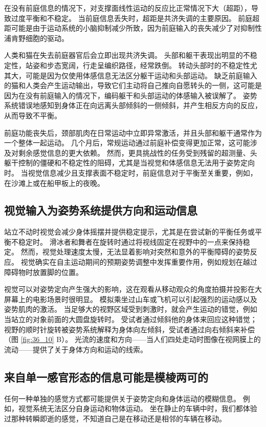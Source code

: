 在没有前庭信息的情况下，对支撑面线性运动的反应比正常情况下大（超距），导致过度平衡和不稳定。 当前庭信息丢失时，超距是共济失调的主要原因。 前庭超距可能是由于运动系统的小脑抑制减少所致，因为前庭输入的丧失减少了对抑制性浦肯野细胞的驱动。

人类和猫在失去前庭器官后会立即出现共济失调。 头部和躯干表现出明显的不稳定性，站姿和步态宽阔，行走呈编织路径，经常跌倒。 转动头部时的不稳定性尤其大，可能是因为仅使用体感信息无法区分躯干运动和头部运动。 缺乏前庭输入的猫和人类会产生运动输出，导致它们主动将自己推向自愿转头的一侧，这可能是因为在没有前庭输入的情况下，编码躯干和头部运动的体感输入被误解了。 姿势系统错误地感知到身体正在向远离头部倾斜的一侧倾斜，并产生相反方向的反应，从而导致不平衡。

前庭功能丧失后，颈部肌肉在日常运动中立即异常激活，并且头部和躯干通常作为一个整体一起运动。 几个月后，常规运动通过前庭补偿变得更加正常，这可能涉及对剩余感觉信息的更大依赖。 然而，更具挑战性的任务受到残留的超测量、头躯干控制的僵硬和不稳定性的阻碍，尤其是当视觉和体感信息无法用于姿势定向时。 当视觉信息减少且支撑表面不稳定时，前庭信息对于平衡至关重要，例如，在沙滩上或在船甲板上的夜晚。

\subsection{视觉输入为姿势系统提供方向和运动信息}
站立不动时视觉会减少身体摇摆并提供稳定提示，尤其是在尝试新的平衡任务或平衡不稳定时。 滑冰者和舞者在旋转时通过将视线固定在视野中的一点来保持稳定。 然而，视觉处理速度太慢，无法显着影响对突然和意外的平衡障碍的姿势反应。 视觉确实在自主运动期间的预期姿势调整中发挥重要作用，例如规划在越过障碍物时放置脚的位置。

视觉可以对姿势定向产生强大的影响，这在观看从移动观众的角度拍摄并投影在大屏幕上的电影场景时很明显。 模拟乘坐过山车或飞机可以引起强烈的运动感以及姿势肌肉的激活。 当足够大的视野区域受到刺激时，就会产生运动的错觉，例如当站立的对象前面的大圆盘旋转时。 受试者通过倾斜他的身体来回应这种错觉； 视野的顺时针旋转被姿势系统解释为身体向左倾斜，受试者通过向右倾斜来补偿（图 \ref{fig:36_10} B）。 光流的速度和方向——当人们四处走动时图像在视网膜上的流动——提供了关于身体方向和运动的线索。

\subsection{来自单一感官形态的信息可能是模棱两可的}
任何一种单独的感觉方式都可能提供关于姿势定向和身体运动的模糊信息。 例如，视觉系统无法区分自身运动和物体运动。 坐在静止的车辆中时，我们都体验过那种转瞬即逝的感觉，不知道自己是在移动还是相邻的车辆在移动。

